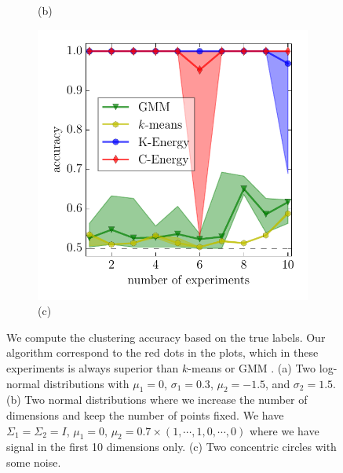 \documentclass[simplex.tex]{subfiles}
\begin{document}
\begin{figure}[h!]
\begin{cframed}
\begin{subfigure}[t]{0.32\textwidth}
(b)
\end{subfigure}
\begin{subfigure}[t]{0.32\textwidth}
\centering
\includegraphics[width=\textwidth]{../../figs/circles.pdf}\\[-.5em]
(c)
\end{subfigure}
\end{cframed}
\caption{
\label{fig:nonpar}
We compute the clustering accuracy based on the true labels.
Our algorithm correspond to the red dots in the plots, which in these
experiments is always superior than $k$-means or GMM .
(a) Two log-normal distributions with $\mu_1=0$, $\sigma_1=0.3$, $\mu_2=-1.5$,
and $\sigma_2=1.5$. 
(b) Two normal distributions where we increase
the number of dimensions and keep the number of points fixed. We have
$\Sigma_1 = \Sigma_2 = I$, $\mu_1=0$, $\mu_2=0.7\times(1,\cdots,1,0,\cdots,0)$
where we have signal in the first 10 dimensions only.
(c) Two concentric circles
with some noise. 
}
\end{figure}
\end{document}
